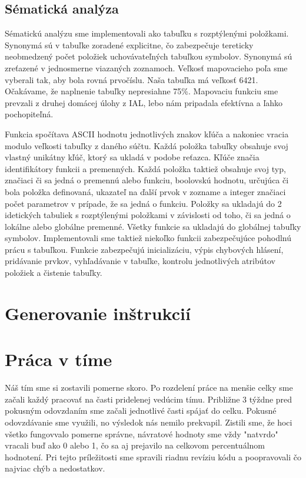 \documentclass [11pt, a4paper]{article}
\begin{document}
\subsection{Sématická analýza}
Sématickú analýzu sme implementovali ako tabuľku s rozptýlenými položkami. Synonymá sú v tabuľke zoradené explicitne, čo zabezpečuje tereticky neobmedzený počet položiek uchovávateľných tabuľkou symbolov. Synonymá sú zreťazené v jednosmerne viazaných zoznamoch. Veľkosť mapovacieho poľa sme vyberali tak, aby bola rovná prvočíslu. Naša tabuľka má veľkosť 6421. Očakávame, že naplnenie tabuľky nepresiahne 75\%. Mapovaciu funkciu sme prevzali z druhej domácej úlohy z IAL, lebo nám pripadala efektívna a ľahko pochopiteľná. 

Funkcia spočítava ASCII hodnotu jednotlivých znakov kľúča a nakoniec vracia modulo veľkosti tabuľky z daného súčtu. Každá položka tabuľky obsahuje svoj vlastný unikátny kľúč, ktorý sa ukladá v podobe reťazca. Kľúče značia identifikátory funkcii a premenných. Každá položka taktiež obsahuje svoj typ, značiaci či sa jedná o premennú alebo funkciu, boolovskú hodnotu, určujúca či bola položka definovaná, ukazateľ na ďalší prvok v zozname a integer značiaci počet parametrov v prípade, že sa jedná o funkciu. Položky sa ukladajú do 2 idetických tabuliek s rozptýlenými položkami v závislosti od toho, či sa jedná o lokálne alebo globálne premenné. Všetky funkcie sa ukladajú do globálnej tabuľky symbolov. Implementovali sme taktiež niekoľko funkcii zabezpečujúce pohodlnú prácu s tabuľkou. Funkcie zabezpečujú inicializáciu, výpis chybových hlásení, pridávanie prvkov, vyhľadávanie v tabuľke, kontrolu jednotlivých atribútov položiek a čistenie tabuľky.

\section{Generovanie inštrukcií}

\section{Práca v tíme}
Náš tím sme si zostavili pomerne skoro. Po rozdelení práce na menšie celky sme začali každý pracovať na časti pridelenej vedúcim tímu. Približne 3 týždne pred pokusným odovzdaním sme začali jednotlivé časti spájať do celku. Pokusné odovzdávanie sme využili, no výsledok nás nemilo prekvapil. Zistili sme, že hoci všetko fungovvalo pomerne správne, návratové hodnoty sme vždy "natvrdo" vracali buď ako 0 alebo 1, čo sa aj prejavilo na celkovom percentuálnom hodnotení. Pri tejto príležitosti sme spravili riadnu revíziu kódu a poopravovali čo najviac chýb a nedostatkov. 
\end{document}
